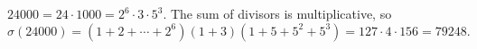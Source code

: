 $24000=24\cdot1000=2^6\cdot3\cdot5^3$. The sum of divisors is multiplicative, so
\[\sigma(24000)=\left(1+2+\cdots+2^6\right)(1+3)\left(1+5+5^2+5^3\right)=127\cdot4\cdot156=\boxed{79248}.\]
